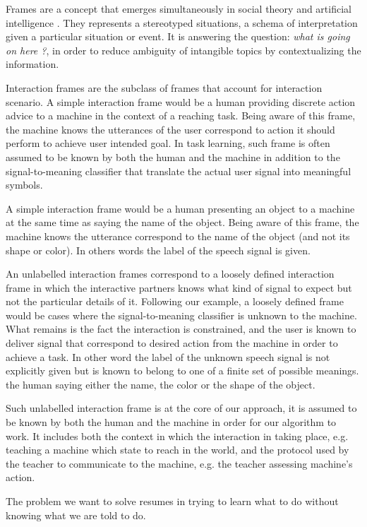 Frames are a concept that emerges simultaneously in social theory \cite{goffman1974frame} and artificial intelligence \cite{minsky1974framework}. They represents a stereotyped situations, a schema of interpretation given a particular situation or event. It is answering the question: \emph{what is going on here ?},  in order to reduce ambiguity of intangible topics by contextualizing the information.

Interaction frames are the subclass of frames that account for interaction scenario. A simple interaction frame would be a human providing discrete action advice to a machine in the context of a reaching task. Being aware of this frame, the machine knows the utterances of the user correspond to action it should perform to achieve user intended goal. In task learning, such frame is often assumed to be known by both the human and the machine in addition to the signal-to-meaning classifier that translate the actual user signal into meaningful symbols.

A simple interaction frame would be a human presenting an object to a machine at the same time as saying the name of the object. Being aware of this frame, the machine knows the utterance correspond to the name of the object (and not its shape or color). In others words the label of the speech signal is given.

An unlabelled interaction frames correspond to a loosely defined interaction frame in which the interactive partners knows what kind of signal to expect but not the particular details of it. Following our example, a loosely defined frame would be cases where the signal-to-meaning classifier is unknown to the machine. What remains is the fact the interaction is constrained, and the user is known to deliver signal that correspond to desired action from the machine in order to achieve a task. In other word the label of the unknown speech signal is not explicitly given but is known to belong to one of a finite set of possible meanings.
the human saying either the name, the color or the shape of the object.

Such unlabelled interaction frame is at the core of our approach, it is assumed to be known by both the human and the machine in order for our algorithm to work. It includes both the context in which the interaction in taking place, e.g. teaching a machine which state to reach in the world, and the protocol used by the teacher to communicate to the machine, e.g. the teacher assessing machine's action.

The problem we want to solve resumes in trying to learn what to do without knowing what we are told to do. 


